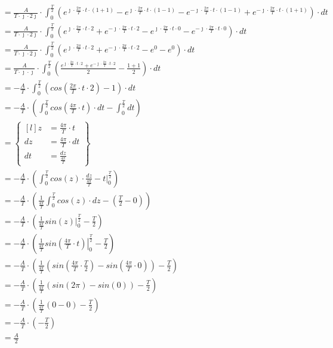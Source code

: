 \begin{align*}
&=\frac{A}{T\cdot \jmath \cdot 2\jmath} \cdot \int_{0}^{\frac{T}{2}} \left(e^{\jmath \cdot \frac{2\pi}{T} \cdot t \cdot \left(1+1\right)} - e^{\jmath \cdot \frac{2\pi}{T} \cdot t \cdot \left(1 - 1\right)} - e^{-\jmath \cdot \frac{2\pi}{T} \cdot t \cdot \left(1 -1\right)} + e^{-\jmath \cdot \frac{2\pi}{T} \cdot t \cdot \left(1+1\right)} \right) \cdot dt\\
&=\frac{A}{T\cdot\jmath\cdot 2\jmath} \cdot \int_{0}^{\frac{T}{2}} \left(e^{\jmath \cdot \frac{2\pi}{T} \cdot t \cdot 2} + e^{-\jmath \cdot \frac{2\pi}{T} \cdot t \cdot 2} - e^{\jmath \cdot \frac{2\pi}{T} \cdot t \cdot 0} - e^{-\jmath \cdot \frac{2\pi}{T} \cdot t \cdot 0} \right) \cdot dt\\
&=\frac{A}{T\cdot\jmath\cdot 2\jmath} \cdot \int_{0}^{\frac{T}{2}} \left(e^{\jmath \cdot \frac{2\pi}{T} \cdot t \cdot 2} + e^{-\jmath \cdot \frac{2\pi}{T} \cdot t \cdot 2} - e^{0} - e^{0} \right) \cdot dt\\
&=\frac{A}{T\cdot \jmath \cdot \jmath} \cdot \int_{0}^{\frac{T}{2}} \left( \frac{e^{\jmath \cdot \frac{2\pi}{T} \cdot t \cdot 2} + e^{-\jmath \cdot \frac{2\pi}{T} \cdot t \cdot 2}}{2} - \frac{1 + 1}{2} \right) \cdot dt\\
&=-\frac{A}{T} \cdot \int_{0}^{\frac{T}{2}} \left( cos\left( \frac{2\pi}{T} \cdot t \cdot 2 \right) - 1 \right) \cdot dt\\
&=-\frac{A}{T} \cdot \left( \int_{0}^{\frac{T}{2}} cos\left( \frac{4\pi}{T} \cdot t \right) \cdot dt - \int_{0}^{\frac{T}{2}} dt \right)\\
&=\begin{Bmatrix*}[l]
z&=\frac{4\pi}{T} \cdot t\\ 
dz&=\frac{4\pi}{T} \cdot dt\\
dt&=\frac{dz}{\frac{4\pi}{T}}
\end{Bmatrix*}\\
&=-\frac{A}{T} \cdot \left( \int_{0}^{\frac{T}{2}} cos\left( z\right) \cdot \frac{dz}{\frac{4\pi}{T}} - \left. t\right|_{0}^{\frac{T}{2}} \right)\\
&=-\frac{A}{T} \cdot \left( \frac{1}{\frac{4\pi}{T}} \int_{0}^{\frac{T}{2}} cos\left( z\right) \cdot dz - \left( \frac{T}{2} - 0\right) \right)\\
&=-\frac{A}{T} \cdot \left( \frac{1}{\frac{4\pi}{T}} \left. sin\left( z\right) \right|_{0}^{\frac{T}{2}} - \frac{T}{2} \right)\\
&=-\frac{A}{T} \cdot \left( \frac{1}{\frac{4\pi}{T}} \left. sin\left( \frac{4\pi}{T} \cdot t \right) \right|_{0}^{\frac{T}{2}} - \frac{T}{2} \right)\\
&=-\frac{A}{T} \cdot \left( \frac{1}{\frac{4\pi}{T}} \left( sin\left( \frac{4\pi}{T} \cdot \frac{T}{2} \right) - sin\left( \frac{4\pi}{T} \cdot 0 \right)\right) - \frac{T}{2} \right)\\
&=-\frac{A}{T} \cdot \left( \frac{1}{\frac{4\pi}{T}} \left( sin\left( 2\pi \right) - sin\left( 0 \right)\right) - \frac{T}{2} \right)\\
&=-\frac{A}{T} \cdot \left( \frac{1}{\frac{4\pi}{T}} \left( 0 - 0\right) - \frac{T}{2} \right)\\
&=-\frac{A}{T} \cdot \left(- \frac{T}{2} \right)\\
&=\frac{A}{2}\\
\end{align*}
